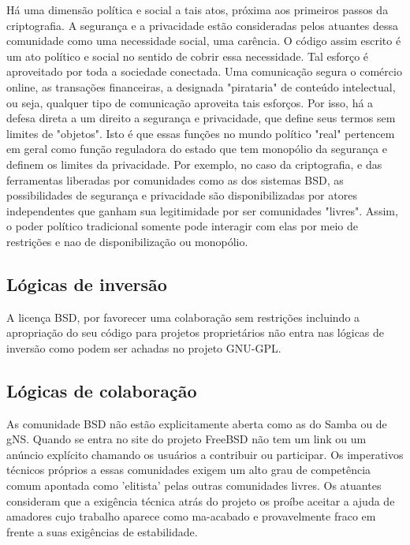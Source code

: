 Há uma dimensão política e social a tais atos, próxima aos primeiros passos da criptografia. A segurança e a privacidade estão consideradas pelos atuantes dessa comunidade como uma necessidade social, uma carência. O código assim escrito é um ato político e social no sentido de cobrir essa necessidade. Tal esforço é aproveitado por toda a sociedade conectada. Uma comunicação segura o comércio online, as transações financeiras, a designada "pirataria" de conteúdo intelectual, ou seja, qualquer tipo de comunicação aproveita tais esforços. Por isso, há a defesa direta a um direito a segurança e privacidade, que define seus termos sem limites de "objetos". Isto é que essas funções no mundo político "real" pertencem em geral como função reguladora do estado que tem monopólio da segurança e definem os limites da privacidade. Por exemplo, no caso da criptografia, e das ferramentas liberadas por comunidades como as dos sistemas BSD, as possibilidades de segurança e privacidade são disponibilizadas por atores independentes que ganham sua legitimidade por ser comunidades "livres". Assim, o poder político tradicional somente pode interagir com elas por meio de restrições e nao de disponibilização ou monopólio.

\subsection{Lógicas de inversão} \label{3.3.3}

A licença BSD, por favorecer uma colaboração sem restrições incluindo a apropriação do seu código para projetos proprietários não entra nas lógicas de inversão como podem ser achadas no projeto GNU-GPL.

\subsection{Lógicas de colaboraç\~ao} \label{3.3.4}

As comunidade BSD não estão explicitamente aberta como as do Samba ou de gNS. Quando se entra no site do projeto FreeBSD não tem um link ou um anúncio explícito chamando os usuários a contribuir ou participar. Os imperativos técnicos próprios a essas comunidades exigem um alto grau de competência comum apontada como 'elitista' pelas outras comunidades livres. Os atuantes consideram que a exigência técnica atrás do projeto os proíbe aceitar a ajuda de amadores cujo trabalho aparece como ma-acabado e provavelmente fraco em frente a suas exigências de estabilidade.

